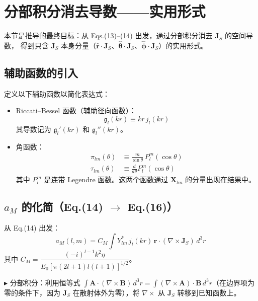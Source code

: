 \section{分部积分消去导数——实用形式}

本节是推导的最终目标：从 Eqs.(13)--(14) 出发，通过分部积分消去 $\mathbf{J}_S$ 的空间导数，
得到只含 $\mathbf{J}_S$ 本身分量（$\hat{\mathbf{r}}\cdot\mathbf{J}_S$、$\hat{\boldsymbol{\theta}}\cdot\mathbf{J}_S$、$\hat{\boldsymbol{\phi}}\cdot\mathbf{J}_S$）的实用形式。

\subsection{辅助函数的引入}

定义以下辅助函数以简化表达式：

\begin{itemize}
  \item Riccati--Bessel 函数（辅助径向函数）：
  \begin{equation}
    \mathfrak{g}_l(kr) \equiv kr\,j_l(kr)
    \label{eq:g_l}
  \end{equation}
  其导数记为 $\mathfrak{g}_l'(kr)$ 和 $\mathfrak{g}_l''(kr)$。

  \item 角函数：
  \begin{align}
    \pi_{lm}(\theta) &\equiv \frac{m}{\sin\theta}\,P_l^m(\cos\theta) \label{eq:pi_lm}\\
    \tau_{lm}(\theta) &\equiv \frac{d}{d\theta}P_l^m(\cos\theta) \label{eq:tau_lm}
  \end{align}
  其中 $P_l^m$ 是连带 Legendre 函数。这两个函数通过 $\mathbf{X}_{lm}$ 的分量出现在结果中。
\end{itemize}

\subsection{$a_M$ 的化简（Eq.(14) $\to$ Eq.(16)）}

从 Eq.(14) 出发：
$$
a_M(l,m) = C_M\int Y_{lm}^*\,j_l(kr)\,\mathbf{r}\cdot(\nabla\times\mathbf{J}_S)\,d^3r
$$
其中 $C_M = \dfrac{(-i)^{l-1}k^2\eta}{E_0[\pi(2l+1)l(l+1)]^{1/2}}$。

$\blacktriangleright$ 分部积分：利用恒等式 $\int \mathbf{A}\cdot(\nabla\times\mathbf{B})\,d^3r = \int (\nabla\times\mathbf{A})\cdot\mathbf{B}\,d^3r$（在边界项为零的条件下，因为 $\mathbf{J}_S$ 在散射体外为零），将 $\nabla\times$ 从 $\mathbf{J}_S$ 转移到已知函数上。

